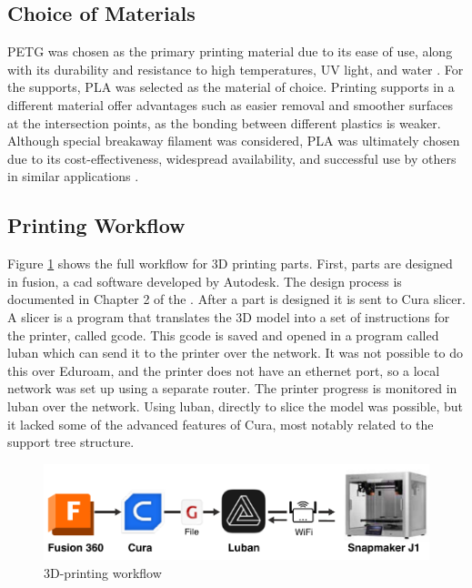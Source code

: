 \subsection{Choice of Materials}
PETG was chosen as the primary printing material due to its ease of use, along with its durability and resistance to high temperatures, UV light, and water \cite{oconnellPETGVsPLA2023}.
For the supports, PLA was selected as the material of choice.
Printing supports in a different material offer advantages such as easier removal and smoother surfaces at the intersection points, as the bonding between different plastics is weaker.
Although special breakaway filament was considered, PLA was ultimately chosen due to its cost-effectiveness, widespread availability, and successful use by others in similar applications \cite{SupportFilamentPETG2023}.

\subsection{Printing Workflow}
Figure \ref{fig:3dp_workflow} shows the full workflow for 3D printing parts.
First, parts are designed in \gls{fusion}, a \gls{cad} software developed by Autodesk.
The design process is documented in Chapter 2 of the \preproject.
After a part is designed it is sent to Cura slicer.
A slicer is a program that translates the 3D model into a set of instructions for the printer, called \gls{gcode}.
This \gls{gcode} is saved and opened in a program called \gls{luban} which can send it to the printer over the network.
It was not possible to do this over Eduroam, and the printer does not have an ethernet port, so a local network was set up using a separate router.
The printer progress is monitored in \gls{luban} over the network.
Using \gls{luban}, directly to slice the model was possible, but it lacked some of the advanced features of Cura, most notably related to the support tree structure.


\begin{figure}[H]
    \centering
    \includegraphics[width=\textwidth]{figures/3d_print/pipeline.pdf}
    \caption{3D-printing workflow \cite{autodeskFusion360Logo} \cite{delaragoCuraLogo2022} \cite{jupi007GcodeIconProposal2020} \cite{snapmakerSnapmakerLogo2020} \cite{snapmakerSnapmakerJ1High}}
    \label{fig:3dp_workflow}
\end{figure}

